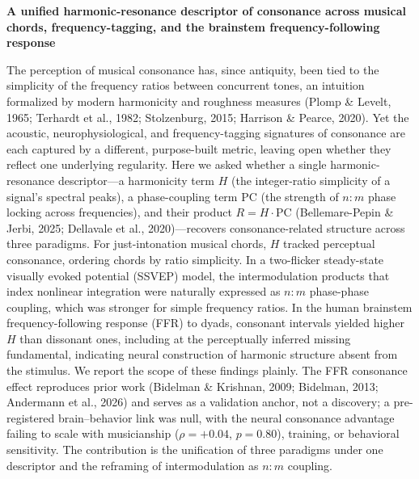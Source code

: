 \documentclass[11pt]{article}
\begin{document}
\thispagestyle{plain}
\begin{center}
{\LARGE\sffamily\bfseries\color{consblue} A unified harmonic-resonance descriptor of consonance across musical chords, frequency-tagging, and the brainstem frequency-following response\par}
\end{center}
\vspace{8pt}
\par\vspace{2pt}
{\small The perception of musical consonance has, since antiquity, been tied to the simplicity of the frequency ratios between concurrent tones, an intuition formalized by modern harmonicity and roughness measures (Plomp \& Levelt, 1965; Terhardt et al., 1982; Stolzenburg, 2015; Harrison \& Pearce, 2020). Yet the acoustic, neurophysiological, and frequency-tagging signatures of consonance are each captured by a different, purpose-built metric, leaving open whether they reflect one underlying regularity. Here we asked whether a single harmonic-resonance descriptor---a harmonicity term $H$ (the integer-ratio simplicity of a signal's spectral peaks), a phase-coupling term $\mathrm{PC}$ (the strength of $n{:}m$ phase locking across frequencies), and their product $R=H\cdot\mathrm{PC}$ (Bellemare-Pepin \& Jerbi, 2025; Dellavale et al., 2020)---recovers consonance-related structure across three paradigms. For just-intonation musical chords, $H$ tracked perceptual consonance, ordering chords by ratio simplicity. In a two-flicker steady-state visually evoked potential (SSVEP) model, the intermodulation products that index nonlinear integration were naturally expressed as $n{:}m$ phase-phase coupling, which was stronger for simple frequency ratios. In the human brainstem frequency-following response (FFR) to dyads, consonant intervals yielded higher $H$ than dissonant ones, including at the perceptually inferred missing fundamental, indicating neural construction of harmonic structure absent from the stimulus. We report the scope of these findings plainly. The FFR consonance effect reproduces prior work (Bidelman \& Krishnan, 2009; Bidelman, 2013; Andermann et al., 2026) and serves as a validation anchor, not a discovery; a pre-registered brain--behavior link was null, with the neural consonance advantage failing to scale with musicianship ($\rho=+0.04$, $p=0.80$), training, or behavioral sensitivity. The contribution is the unification of three paradigms under one descriptor and the reframing of intermodulation as $n{:}m$ coupling.\par}
\end{document}
